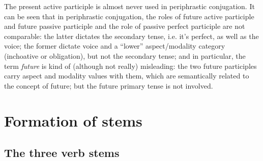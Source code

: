 \documentclass[a4paper, oneside, 12pt]{report}
\newcommand*{\term}[1]{\emph{#1}}
\begin{document}
The present active participle is almost never used in periphrastic conjugation.
It can be seen that in periphrastic conjugation,
the roles of future active participle and future passive participle 
and the role of passive perfect participle 
are not comparable:
the latter dictates the secondary tense, i.e. it's perfect, 
as well as the voice;
the former dictate voice and a ``lower'' aspect/modality category 
(inchoative or obligation),
but not the secondary tense;
and in particular, the term \term{future} is kind of (although not really) misleading:
the two future participles carry aspect and modality values with them, 
which are semantically related to the concept of future; 
but the future primary tense is not involved.

\section{Formation of stems}\label{sec:verb-inflection.stem}

\subsection{The three verb stems}\label{sec:three-latin-stem}
\end{document}

